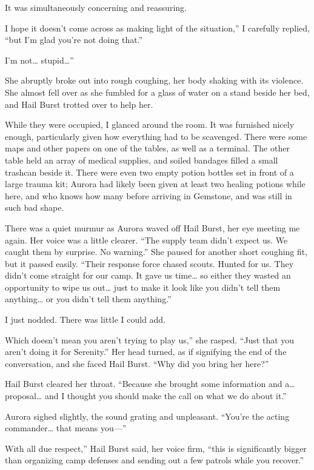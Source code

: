 It was simultaneously concerning and reassuring.

\leavevmode{}I hope it doesn’t come across as making light of the situation,” I carefully replied, “but I’m glad you’re not doing that.”

\leavevmode{}I’m not… stupid…”

She abruptly broke out into rough coughing, her body shaking with its violence. She almost fell over as she fumbled for a glass of water on a stand beside her bed, and Hail Burst trotted over to help her.

While they were occupied, I glanced around the room. It was furnished nicely enough, particularly given how everything had to be scavenged. There were some maps and other papers on one of the tables, as well as a terminal. The other table held an array of medical supplies, and soiled bandages filled a small trashcan beside it. There were even two empty potion bottles set in front of a large trauma kit; Aurora had likely been given at least two healing potions while here, and who knows how many before arriving in Gemstone, and was still in such bad shape.

There was a quiet murmur as Aurora waved off Hail Burst, her eye meeting me again. Her voice was a little clearer. “The supply team didn’t expect us. We caught them by surprise. No warning.” She paused for another short coughing fit, but it passed easily. “Their response force chased scouts. Hunted for us. They didn’t come straight for our camp. It gave us time… so either they wasted an opportunity to wipe us out… just to make it look like you didn’t tell them anything… or you didn’t tell them anything.”

I just nodded. There was little I could add.

\leavevmode{}Which doesn’t mean you aren’t trying to play us,” she rasped. “Just that you aren’t doing it for Serenity.” Her head turned, as if signifying the end of the conversation, and she faced Hail Burst. “Why did you bring her here?”

Hail Burst cleared her throat. “Because she brought some information and a… proposal… and I thought you should make the call on what we do about it.”

Aurora sighed slightly, the sound grating and unpleasant. “You’re the acting commander… that means you—”

\leavevmode{}With all due respect,” Hail Burst said, her voice firm, “this is significantly bigger than organizing camp defenses and sending out a few patrols while you recover.”

